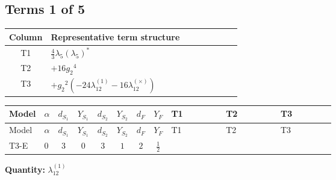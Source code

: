 \documentclass[8pt]{article}
\begin{document}
\begin{landscape}
\subsection*{Terms 1 of 5}
\begin{center}
\begin{tabular}{@{}c >{\raggedright\arraybackslash}p{0.82\linewidth}@{}}
\toprule
Column & Representative term structure \\
\midrule
T1 & \(\displaystyle \frac{4}{3} {\lambda_5} \left({\lambda_5}\right)^{*}\) \\
\midrule
T2 & \(\displaystyle +16 {g_2}^4\) \\
\midrule
T3 & \(\displaystyle +{g_2}^2 (-24 {\lambda_{12}^{(1)}}-16 {\lambda_{12}^{(\times)}})\) \\
\midrule
\bottomrule
\end{tabular}
\end{center}
\smallskip
\tiny
\begin{longtable}{@{}llcccccc >{\raggedright\arraybackslash}p{0.21\linewidth} >{\raggedright\arraybackslash}p{0.21\linewidth} >{\raggedright\arraybackslash}p{0.21\linewidth}@{}}
\toprule
Model & $\alpha$ & $d_{S_1}$ & $Y_{S_1}$ & $d_{S_2}$ & $Y_{S_2}$ & $d_F$ & $Y_F$ & T1 & T2 & T3 \\
\midrule
\endfirsthead
\toprule
Model & $\alpha$ & $d_{S_1}$ & $Y_{S_1}$ & $d_{S_2}$ & $Y_{S_2}$ & $d_F$ & $Y_F$ & T1 & T2 & T3 \\
\midrule
\endhead
T3-E & $0$ & $3$ & $0$ & $3$ & $1$ & $2$ & $\frac{1}{2}$ & \scriptsize\adjustbox{max width=\linewidth}{$\begin{gathered} \frac{4}{3} {\lambda_5} \left({\lambda_5}\right)^{*}\end{gathered}$} & \scriptsize\adjustbox{max width=\linewidth}{$\begin{gathered} +16 {g_2}^4\end{gathered}$} & \scriptsize\adjustbox{max width=\linewidth}{$\begin{gathered} +{g_2}^2 (-24 {\lambda_{12}^{(1)}}-16 {\lambda_{12}^{(\times)}})\end{gathered}$} \\
\midrule
\bottomrule
\end{longtable}
\clearpage
\noindent\textbf{Quantity: }$\lambda_{12}^{(1)}$\par\smallskip

\end{landscape}
\end{document}
